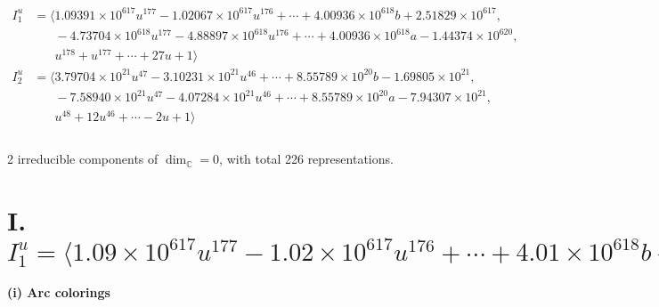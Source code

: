 \documentclass[1p]{elsarticle_modified}
\theoremstyle{definition}
\begin{document}
\begin{align*}
I^u_{1}&=\langle 
1.09391\times10^{617} u^{177}-1.02067\times10^{617} u^{176}+\cdots+4.00936\times10^{618} b+2.51829\times10^{617},\\
\phantom{I^u_{1}}&\phantom{= \langle  }-4.73704\times10^{618} u^{177}-4.88897\times10^{618} u^{176}+\cdots+4.00936\times10^{618} a-1.44374\times10^{620},\\
\phantom{I^u_{1}}&\phantom{= \langle  }u^{178}+u^{177}+\cdots+27 u+1\rangle \\
I^u_{2}&=\langle 
3.79704\times10^{21} u^{47}-3.10231\times10^{21} u^{46}+\cdots+8.55789\times10^{20} b-1.69805\times10^{21},\\
\phantom{I^u_{2}}&\phantom{= \langle  }-7.58940\times10^{21} u^{47}-4.07284\times10^{21} u^{46}+\cdots+8.55789\times10^{20} a-7.94307\times10^{21},\\
\phantom{I^u_{2}}&\phantom{= \langle  }u^{48}+12 u^{46}+\cdots-2 u+1\rangle \\
\\
\end{align*}
\raggedright * 2 irreducible components of $\dim_{\mathbb{C}}=0$, with total 226 representations.\\
\newpage
\renewcommand{\arraystretch}{1}
\centering \section*{I. $I^u_{1}= \langle 1.09\times10^{617} u^{177}-1.02\times10^{617} u^{176}+\cdots+4.01\times10^{618} b+2.52\times10^{617},\;-4.74\times10^{618} u^{177}-4.89\times10^{618} u^{176}+\cdots+4.01\times10^{618} a-1.44\times10^{620},\;u^{178}+u^{177}+\cdots+27 u+1 \rangle$}
\flushleft \textbf{(i) Arc colorings}\\
\end{document}
